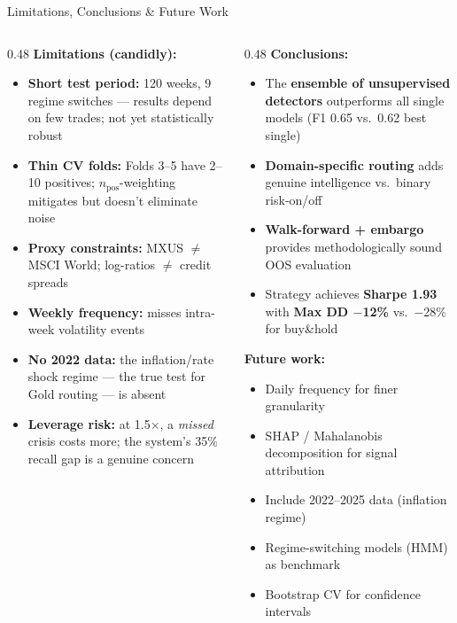 \documentclass[aspectratio=169, 11pt]{beamer}
\begin{document}
\begin{frame}{Limitations, Conclusions \& Future Work}
\begin{columns}[T]
\begin{column}{0.48\textwidth}
  \textbf{Limitations (candidly):}
  \begin{itemize}\setlength\itemsep{0.08cm}
    \footnotesize
    \item \textbf{Short test period:} 120 weeks, 9 regime switches --- results depend on few trades; not yet statistically robust
    \item \textbf{Thin CV folds:} Folds 3--5 have 2--10 positives; $n_{\text{pos}}$-weighting mitigates but doesn't eliminate noise
    \item \textbf{Proxy constraints:} MXUS $\neq$ MSCI World; log-ratios $\neq$ credit spreads
    \item \textbf{Weekly frequency:} misses intra-week volatility events
    \item \textbf{No 2022 data:} the inflation/rate shock regime --- the true test for Gold routing --- is absent
    \item \textbf{Leverage risk:} at 1.5$\times$, a \textit{missed} crisis costs more; the system's 35\% recall gap is a genuine concern
  \end{itemize}
\end{column}
\begin{column}{0.48\textwidth}
  \textbf{Conclusions:}
  \begin{itemize}\setlength\itemsep{0.08cm}
    \footnotesize
    \item The \textbf{ensemble of unsupervised detectors} outperforms all single models (F1 0.65 vs.\ 0.62 best single)
    \item \textbf{Domain-specific routing} adds genuine intelligence vs.\ binary risk-on/off
    \item \textbf{Walk-forward + embargo} provides methodologically sound OOS evaluation
    \item Strategy achieves \textbf{Sharpe 1.93} with \textbf{Max DD $-$12\%} vs.\ $-$28\% for buy\&hold
  \end{itemize}
  \vspace{0.2cm}
  \textbf{Future work:}
  \begin{itemize}\setlength\itemsep{0.05cm}
    \footnotesize
    \item Daily frequency for finer granularity
    \item SHAP / Mahalanobis decomposition for signal attribution
    \item Include 2022--2025 data (inflation regime)
    \item Regime-switching models (HMM) as benchmark
    \item Bootstrap CV for confidence intervals
  \end{itemize}
\end{column}
\end{columns}
\end{frame}
\end{document}
